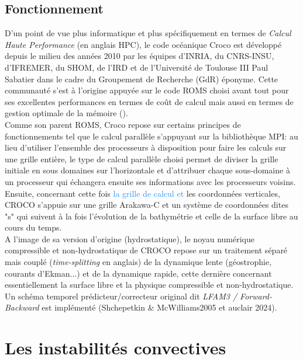\documentclass{rapportECC}
\newcommand{\FAadd}[1]{\textcolor{DodgerBlue}{{#1}}}                     %
\begin{document}
\subsection{Fonctionnement}
D'un point de vue plus informatique et plus spécifiquement en termes de \textit{Calcul Haute Performance} (en anglais HPC), le code océanique Croco est développé depuis le milieu des années 2010 par les équipes d'INRIA, du CNRS-INSU, d'IFREMER, du SHOM, de l'IRD et de l'Université de Toulouse III Paul Sabatier dans le cadre du Groupement de Recherche (GdR) éponyme. Cette communauté s'est à l'origine appuyée sur le code ROMS choisi avant tout pour ses excellentes performances en termes de coût de calcul mais aussi en termes de gestion optimale de la mémoire (\cite{shchepetkin_regional_2005}).\\
Comme son parent ROMS, Croco repose sur certains principes de fonctionnements tel que le calcul parallèle s'appuyant sur la bibliothèque MPI: au lieu d'utiliser l'ensemble des processeurs à disposition pour faire les calculs sur une grille entière, le type de calcul parallèle choisi permet de diviser la grille initiale en sous domaines sur l'horizontale et d'attribuer chaque sous-domaine à un processeur qui échangera ensuite ses informations avec les processeurs voisins. \\
Ensuite, concernant cette fois \FAadd{la grille de calcul et} les coordonnées verticales, CROCO s'appuie sur une grille Arakawa-C et un système de coordonnées dites "s" qui suivent à la fois l'évolution de la bathymétrie et celle de la surface libre au cours du temps. \\
A l'image de sa version d'origine (hydrostatique), le noyau numérique compressible et non-hydrostatique de CROCO repose sur un traitement séparé mais couplé (\textit{time-splitting} en anglais) de la dynamique lente (géostrophie, courants d'Ekman...) et de la dynamique rapide, cette dernière concernant essentiellement la surface libre et la physique compressible et non-hydrostatique. Un schéma temporel prédicteur/correcteur original dit \textit{LFAM3 / Forward-Backward} est implémenté (Shchepetkin \& McWilliams2005 et auclair 2024).\\




\section{Les instabilités convectives}
\end{document}
